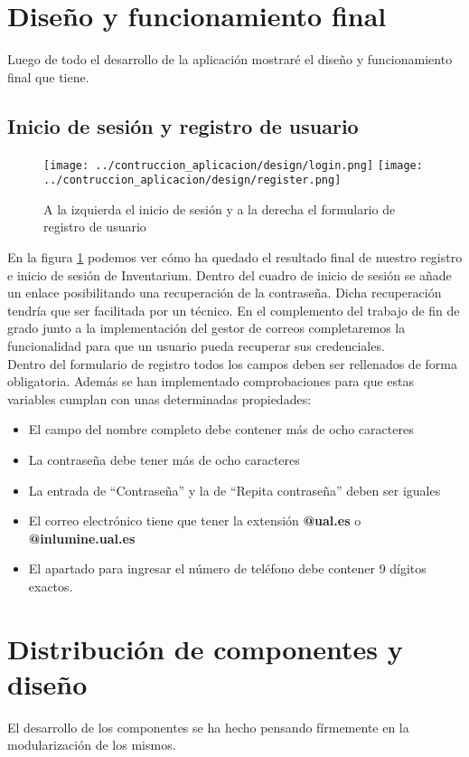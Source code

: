 \section{Diseño y funcionamiento final}
Luego de todo el desarrollo de la aplicación mostraré el diseño y funcionamiento final que tiene.

\subsection{Inicio de sesión y registro de usuario}
\begin{figure}[h]
    \centering
    \texttt{[image: ../contruccion\_aplicacion/design/login.png]}
    \texttt{[image: ../contruccion\_aplicacion/design/register.png]}
    \caption{A la izquierda el inicio de sesión y a la derecha el formulario de registro de usuario}\label{fig:register-and-login}
\end{figure}
En la figura \ref{fig:register-and-login} podemos ver cómo ha quedado el resultado final de nuestro registro e inicio de sesión de Inventarium. Dentro del cuadro de inicio de sesión se añade un enlace posibilitando una recuperación de la contraseña. Dicha recuperación tendría que ser facilitada por un técnico. En el complemento del trabajo de fin de grado junto a la implementación del gestor de correos completaremos la funcionalidad para que un usuario pueda recuperar sus credenciales.
\\Dentro del formulario de registro todos los campos deben ser rellenados de forma obligatoria. Además se han implementado comprobaciones para que estas variables cumplan con unas determinadas propiedades:
\begin{itemize}
    \item El campo del nombre completo debe contener más de ocho caracteres
    \item La contraseña debe tener más de ocho caracteres
    \item La entrada de ``Contraseña'' y la de ``Repita contraseña'' deben ser iguales
    \item El correo electrónico tiene que tener la extensión \textbf{@ual.es} o \textbf{@inlumine.ual.es}
    \item El apartado para ingresar el número de teléfono debe contener 9 dígitos exactos.
\end{itemize}
\section{Distribución de componentes y diseño}
El desarrollo de los componentes se ha hecho pensando fírmemente en la modularización de los mismos.

